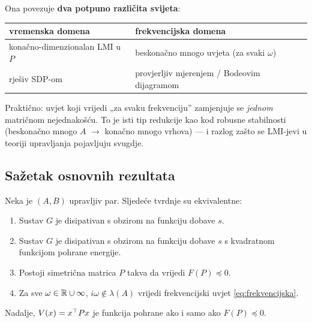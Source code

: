 \begin{napomena}
Ona povezuje \textbf{dva potpuno različita svijeta}:
\begin{center}
\begin{tabular}{ll}
\toprule
\textbf{vremenska domena} & \textbf{frekvencijska domena} \\
\midrule
konačno-dimenzionalan LMI u $P$
  & beskonačno mnogo uvjeta (za svaki $\omega$) \\
rješiv SDP-om
  & provjerljiv mjerenjem / Bodeovim dijagramom \\
\bottomrule
\end{tabular}
\end{center}
Praktično: uvjet koji vrijedi „za svaku frekvenciju” zamjenjuje se
\emph{jednom} matričnom nejednakošću. To je isti tip redukcije kao kod robusne
stabilnosti  (beskonačno mnogo $A$ $\to$ konačno mnogo vrhova) --- i
razlog zašto se LMI-jevi u teoriji upravljanja pojavljuju svugdje.
\end{napomena}

\subsection{Sažetak osnovnih rezultata}

\begin{teorem}
Neka je $(A,B)$ upravljiv par. Sljedeće tvrdnje su ekvivalentne:
\begin{enumerate}[label=\roman*)]
  \item Sustav $G$ je disipativan s obzirom na funkciju dobave $s$.
  \item Sustav $G$ je disipativan s obzirom na funkciju dobave $s$ s
        kvadratnom funkcijom pohrane energije.
  \item Postoji simetrična matrica $P$ takva da vrijedi $F(P) \preceq 0$.
  \item Za sve $\omega \in \mathbb{R} \cup \infty$, $i\omega \notin \lambda(A)$ vrijedi
        frekvencijski uvjet \eqref{eq:frekvencijska}.
\end{enumerate}
Nadalje, $V(x) = x^{\top} Px$ je funkcija pohrane ako i samo ako $F(P) \preceq 0$.
\end{teorem}

